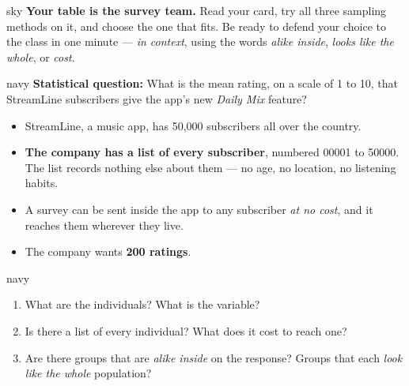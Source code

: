 \documentclass[12pt]{article}
\newcommand{\answerspace}[2]{\par\nopagebreak\noindent\begin{minipage}[t][#1][t]{\linewidth}%
  \color{keyred}\bfseries\footnotesize #2\end{minipage}\par}
\begin{document}
\clearpage
{}

\boxguard[10]
\begin{headlinebox}{sky}
\small
\textbf{Your table is the survey team.} Read your card, try all three sampling methods on it,
and choose the one that fits. Be ready to defend your choice to the class in one minute ---
\emph{in context}, using the words \emph{alike inside}, \emph{looks like the whole}, or
\emph{cost}.
\end{headlinebox}

\vspace{0.08in}

\boxguard[12]
\begin{scenariobox}{navy}
\small
\textbf{Statistical question:} What is the mean rating, on a scale of 1 to 10, that StreamLine
subscribers give the app's new \emph{Daily Mix} feature?
\begin{itemize}[leftmargin=1.3em, itemsep=2pt, topsep=4pt]
  \item StreamLine, a music app, has 50{,}000 subscribers all over the country.
  \item \textbf{The company has a list of every subscriber}, numbered 00001 to 50000. The list
        records nothing else about them --- no age, no location, no listening habits.
  \item A survey can be sent inside the app to any subscriber \emph{at no cost}, and it reaches
        them wherever they live.
  \item The company wants \textbf{200 ratings}.
\end{itemize}
\end{scenariobox}

\vspace{0.08in}

\boxguard[10]
\begin{scenariobox}{navy}
\small
\begin{enumerate}[label=\textbf{\alph*.}, leftmargin=1.6em, itemsep=4pt]
  \item What are the individuals? What is the variable?
        \answerspace{1.1cm}{}
  \item Is there a list of every individual? What does it cost to reach one?
        \answerspace{1.3cm}{}
  \item Are there groups that are \emph{alike inside} on the response? Groups that each
        \emph{look like the whole} population?
        \answerspace{1.3cm}{}
\end{enumerate}
\end{scenariobox}
\end{document}
